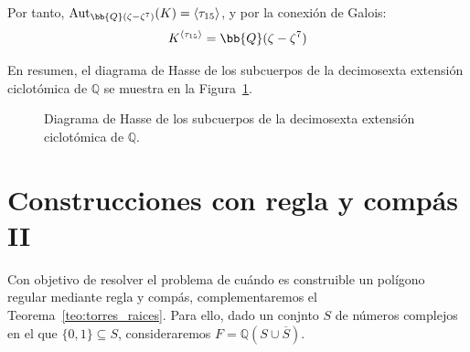 \begin{ejemplo}
\begin{itemize}
\begin{itemize}
            Por tanto, $\Aut_{\bb{Q}(\zeta-\zeta^7)}(K) = \langle \tau_{15}\rangle$, y por la conexión de Galois:
            \begin{equation*}
                K^{\langle \tau_{15}\rangle} = \bb{Q}(\zeta-\zeta^7)
            \end{equation*}
        \end{itemize}
    \end{itemize}
    
    En resumen, el diagrama de Hasse de los subcuerpos de la decimosexta extensión ciclotómica de $\mathbb{Q}$ se muestra en la Figura~\ref{fig:diagrama_hasse_subcuerpos_Qzeta16}.
    \begin{figure}[H]
        \centering
        \caption{Diagrama de Hasse de los subcuerpos de la decimosexta extensión ciclotómica de $\mathbb{Q}$.}
        \label{fig:diagrama_hasse_subcuerpos_Qzeta16}
    \end{figure}
\end{ejemplo}

\section{Construcciones con regla y compás II}\label{sec:construcciones_regla_compas_ii}
\noindent
Con objetivo de resolver el problema de cuándo es construible un polígono regular mediante regla y compás, complementaremos el Teorema~\ref{teo:torres_raices}. Para ello, dado un conjnto $S$ de números complejos en el que $\{0,1\}\subseteq S$, consideraremos $F = \mathbb{Q}(S\cup \overline{S})$.

